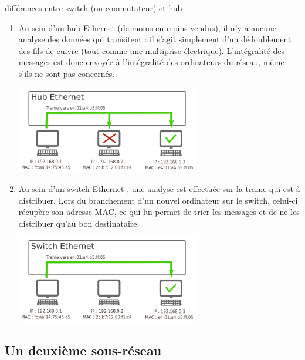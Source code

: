 \documentclass[a4paper,dvipsnames]{article}
\begin{document}
\medskip

\begin{definition}[breakable]{différences entre switch (ou commutateur) et hub}{}
 \begin{enumerate}
   \item Au sein d'un {\color{red}hub Ethernet} (de moins en moins vendus), il n'y a aucune analyse des données qui transitent : il s'agit simplement d'un dédoublement des fils de cuivre (tout comme une multiprise électrique). L'intégralité des messages est donc envoyée à l'intégralité des ordinateurs du réseau, même s'ils ne sont pas concernés.

     \begin{center}
       \includegraphics[width=8cm]{img/hub.png}
     \end{center}

   \item Au sein d'un {\color{red}switch Ethernet} , une analyse est effectuée sur la trame qui est à distribuer. Lors du branchement d'un nouvel ordinateur sur le switch, celui-ci récupère son adresse MAC, ce qui lui permet de trier les messages et de ne les distribuer qu'au bon destinataire.

     \begin{center}
       \includegraphics[width=8cm]{img/switch.png}
     \end{center}
 \end{enumerate} 
\end{definition}

\subsection{Un deuxième sous-réseau}
\end{document}
